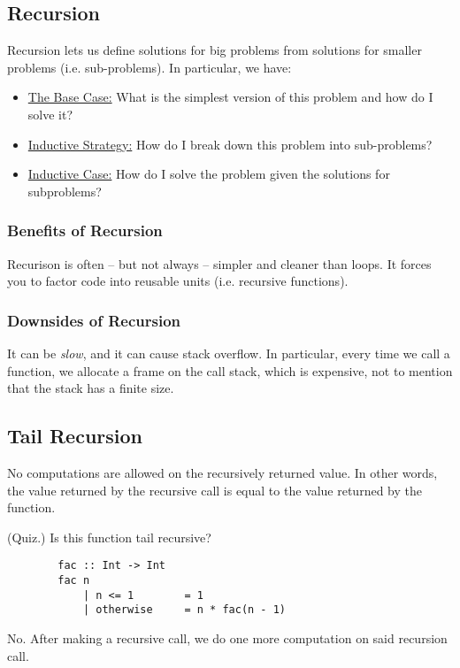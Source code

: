 \documentclass[letterpaper]{article}
\begin{document}
\subsection{Recursion}
Recursion lets us define solutions for big problems from solutions for smaller problems (i.e. sub-problems). In particular, we have: 
\begin{itemize}
    \item \underline{The Base Case:} What is the simplest version of this problem and how do I solve it? 
    \item \underline{Inductive Strategy:} How do I break down this problem into sub-problems? 
    \item \underline{Inductive Case:} How do I solve the problem given the solutions for subproblems? 
\end{itemize}

\subsubsection{Benefits of Recursion}
Recurison is often -- but not always -- simpler and cleaner than loops. It forces you to factor code into reusable units (i.e. recursive functions).

\subsubsection{Downsides of Recursion}
It can be \emph{slow}, and it can cause stack overflow. In particular, every time we call a function, we allocate a frame on the call stack, which is expensive, not to mention that the stack has a finite size. 

\subsection{Tail Recursion}
No computations are allowed on the recursively returned value. In other words, the value returned by the recursive call is equal to the value returned by the function. 

\begin{mdframed}[]
    (Quiz.) Is this function tail recursive?
    \begin{verbatim}
        fac :: Int -> Int 
        fac n 
            | n <= 1        = 1
            | otherwise     = n * fac(n - 1)
    \end{verbatim}

    \begin{mdframed}[]
        No. After making a recursive call, we do one more computation on said recursion call. 
    \end{mdframed}
\end{mdframed}
\end{document}
